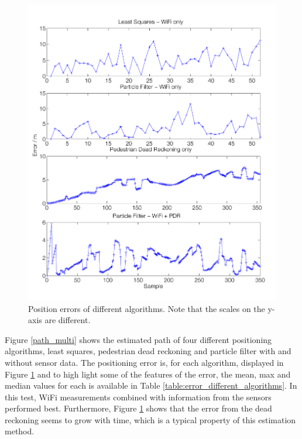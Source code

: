 \documentclass{LTHthesis}
\begin{document}
%
\begin{figure}[!hbt]

\includegraphics[width=1\textwidth ]{images/sensor_fused/error_multi}
\caption{Position errors of different algorithms. Note that the scales on the y-axis are different.}\label{error_multi}
\end{figure}
%
Figure \ref{path_multi} shows the estimated path of four different positioning algorithms, least squares, pedestrian dead reckoning and particle filter with and without sensor data. The positioning error is, for each algorithm, displayed in Figure \ref{error_multi} and to high light some of the features of the error, the mean, max and median values for each is available in Table \ref{table:error_different_algorithms}. In this test, WiFi measurements combined with information from the sensors performed best. Furthermore, Figure \ref{error_multi} shows that the error from the dead reckoning seems to grow with time, which is a typical property of this estimation method. 
%
\end{document}
